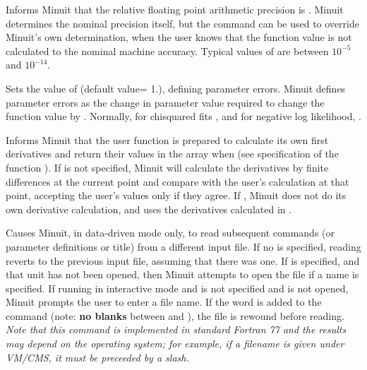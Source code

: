 
Informs Minuit that the relative floating point arithmetic
precision is .
Minuit determines the nominal precision itself, but the  command
can be used to override Minuit's own determination, when the user
knows that the  function value is not calculated to the nominal
machine accuracy. Typical values of  are between
$10^{-5}$ and $10^{-14}$.


Sets the value of  (default value= 1.), defining parameter errors.
Minuit defines parameter errors as the change in parameter value
required to change the function value by .  
Normally, for chisquared
fits , and for negative log likelihood, .


Informs Minuit that the user function is prepared to calculate
its own first derivatives and return their values in the array
 when  
(see specification of the function ).
If \Lit{[force]} is not specified, Minuit will calculate the 
derivatives by finite differences at the current point and
compare with the user's calculation at that point,
accepting the user's values only if they agree.
If , Minuit does not do its own derivative calculation,
and uses the derivatives calculated in .


Causes Minuit, in data-driven mode only, to read subsequent
commands (or parameter definitions or title) from a different input file.
If no \Lit{[unitno]} is specified, reading reverts to the previous input
file, assuming that there was one.  If \Lit{[unitno]} is specified, and that
unit has not been opened, then Minuit attempts to open the file
\Lit{[filename]} if a name is specified. If running in interactive mode and
\Lit{[filename]} is not specified and \Lit{[unitno]} is not opened,
Minuit prompts the user to enter a file name.
If the word  is added to the command (note:
{\bf no blanks} between  and ),
the file is rewound before reading.
{\em Note that this command is implemented in standard Fortran 77
and the results may depend on the operating system; for example,
if a filename is given under VM/CMS, it must be preceeded by a slash.}

